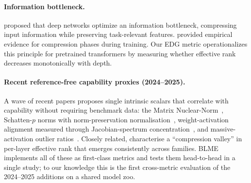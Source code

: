 \documentclass[preprint]{neurips_2025}
\begin{document}
\paragraph{Information bottleneck.}
\citet{tishby2015deep} proposed that deep networks optimize an information bottleneck, compressing input information while preserving task-relevant features.
\citet{shwartz2017opening} provided empirical evidence for compression phases during training.
Our EDG metric operationalizes this principle for pretrained transformers by measuring whether effective rank decreases monotonically with depth.

\paragraph{Recent reference-free capability proxies (2024--2025).}
A wave of recent papers proposes single intrinsic scalars that correlate with capability without requiring benchmark data: the Matrix Nuclear-Norm~\citep{li2024matrix}, Schatten-$p$ norms with norm-preservation normalisation~\citep{wei2025schatten}, weight-activation alignment measured through Jacobian-spectrum concentration~\citep{park2024waa}, and massive-activation outlier ratios~\citep{sun2024massiveactivations}. Closely related, \citet{pedrotti2025compressionvalley} characterise a ``compression valley'' in per-layer effective rank that emerges consistently across families. BLME implements all of these as first-class metrics and tests them head-to-head in a single study; to our knowledge this is the first cross-metric evaluation of the 2024--2025 additions on a shared model zoo.
\end{document}
